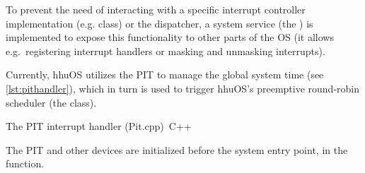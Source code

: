 To prevent the need of interacting with a specific interrupt controller implementation (e.g.
 class) or the dispatcher, a system service (the ) is implemented
to expose this functionality to other parts of the OS (it allows e.g.\ registering interrupt
handlers or masking and unmasking interrupts).

Currently, hhuOS utilizes the PIT to manage the global system time (see \autoref{lst:pithandler}),
which in turn is used to trigger hhuOS's preemptive round-robin scheduler (the 
class).

\begin{codeblock}[label=lst:pithandler]{The PIT interrupt handler (Pit.cpp)~\cite{hhuos}}{C++}
\end{codeblock}

The PIT and other devices are initialized before the system entry point, in the
 function.
